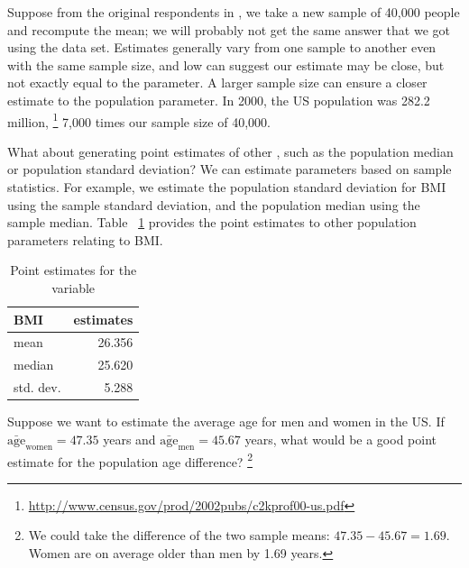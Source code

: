 Suppose from the original respondents in , we take a new sample of 40,000 people and recompute the mean; we will probably not get the same answer that we got using the  data set. Estimates generally vary from one sample to another even with the same sample size, and low  can suggest our estimate may be close, but not exactly equal to the parameter. A larger sample size can ensure a closer estimate to the population parameter. In 2000, the US population was 282.2 million, \footnote{\url{http://www.census.gov/prod/2002pubs/c2kprof00-us.pdf}} 7,000 times our sample size of 40,000. 

What about generating point estimates of other , such as the population median or population standard deviation? We can estimate parameters based on sample statistics. For example, we estimate the population standard deviation for BMI using the sample standard deviation, and the population median using the sample median. Table ~\ref{BMIEstimates} provides the point estimates to other population parameters relating to BMI.

\begin{table}[ht]
\centering
\begin{tabular}{lr}
  \hline
BMI & estimates \\ 
  \hline
mean & 26.356 \\ 
  median & 25.620 \\ 
  std. dev. & 5.288 \\ 
   \hline
\end{tabular}
\caption{Point estimates for the  variable} 
\label{BMIEstimates}
\end{table}

\begin{exercise} \label{pointEstimateOfDesiredWeights}
Suppose we want to estimate the average age for men and women in the US. If $\bar{\mathrm{age}}_{\mathrm{women}} = 47.35 $ years and $\bar{\mathrm{age}} _ {\mathrm{men}} = 45.67 $ years, what would be a good point estimate for the population age difference? \footnote{We could take the difference of the two sample means: $47.35 - 45.67 =  1.69$. Women are on average older than men by 1.69 years.}
\end{exercise}

